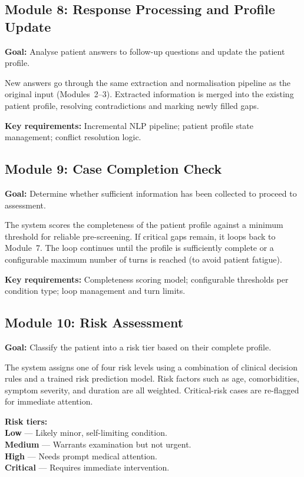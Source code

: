 \documentclass[12pt,a4paper]{article}
\begin{document}
\subsection{Module 8: Response Processing and Profile Update}
\label{sec:m8}

\textbf{Goal:} Analyse patient answers to follow-up questions and update
the patient profile.

New answers go through the same extraction and normalisation pipeline as
the original input (Modules~2--3). Extracted information is merged into
the existing patient profile, resolving contradictions and marking
newly filled gaps.

\textbf{Key requirements:} Incremental NLP pipeline; patient profile
state management; conflict resolution logic.

\subsection{Module 9: Case Completion Check}
\label{sec:m9}

\textbf{Goal:} Determine whether sufficient information has been
collected to proceed to assessment.

The system scores the completeness of the patient profile against a
minimum threshold for reliable pre-screening. If critical gaps remain,
it loops back to Module~7. The loop continues until the profile is
sufficiently complete or a configurable maximum number of turns is
reached (to avoid patient fatigue).

\textbf{Key requirements:} Completeness scoring model; configurable
thresholds per condition type; loop management and turn limits.

\subsection{Module 10: Risk Assessment}
\label{sec:m10}

\textbf{Goal:} Classify the patient into a risk tier based on their
complete profile.

The system assigns one of four risk levels using a combination of
clinical decision rules and a trained risk prediction model. Risk
factors such as age, comorbidities, symptom severity, and duration are
all weighted. Critical-risk cases are re-flagged for immediate attention.

\begin{designbox}
\textbf{Risk tiers:}\\[2pt]
\textbf{Low} --- Likely minor, self-limiting condition.\\
\textbf{Medium} --- Warrants examination but not urgent.\\
\textbf{High} --- Needs prompt medical attention.\\
\textbf{Critical} --- Requires immediate intervention.
\end{designbox}
\end{document}
